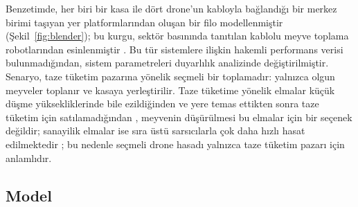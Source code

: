 Benzetimde, her biri bir kasa ile dört drone'un kabloyla bağlandığı bir merkez birimi taşıyan
yer platformlarından oluşan bir filo modellenmiştir (Şekil~\ref{fig:blender}); bu kurgu, sektör
basınında tanıtılan kablolu meyve toplama robotlarından esinlenmiştir \citep{oitzman_2021_tevel,coxworth_2022_fruitpicking}.
Bu tür sistemlere ilişkin hakemli performans verisi bulunmadığından, sistem parametreleri
duyarlılık analizinde değiştirilmiştir. Senaryo, taze tüketim pazarına yönelik seçmeli
bir toplamadır: yalnızca olgun meyveler toplanır ve kasaya yerleştirilir. Taze tüketime
yönelik elmalar küçük düşme yüksekliklerinde bile ezildiğinden \citep{schulte_1992_apple}
ve yere temas ettikten sonra taze tüketim için satılamadığından \citep{ewing_2018_food},
meyvenin düşürülmesi bu elmalar için bir seçenek değildir; sanayilik elmalar ise sıra
üstü sarsıcılarla çok daha hızlı hasat edilmektedir \citep{brawner_2025_overtherow}; bu nedenle
seçmeli drone hasadı yalnızca taze tüketim pazarı için anlamlıdır.

\subsection{Model}

\begin{table}[t]
\centering
\caption{Benzetim parametreleri. ``Varsayım'' ifadesi, ölçülmüş karşılığı bulunamayan
değerleri belirtir; duyarlılık analizi, aralık sütununda değer verilen parametrelerle
ve her seferinde tek parametre değiştirilerek sınırlandırılmıştır}\label{tab:params}
\scriptsize

\end{table}

